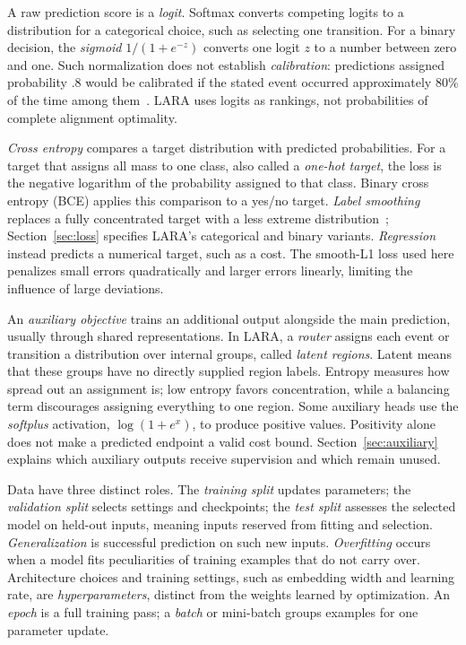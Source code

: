 A raw prediction score is a \emph{logit}. Softmax converts competing logits to a distribution for a categorical choice, such as selecting one transition. For a binary decision, the \emph{sigmoid} $1/(1+e^{-z})$ converts one logit $z$ to a number between zero and one. Such normalization does not establish \emph{calibration}: predictions assigned probability $.8$ would be calibrated if the stated event occurred approximately 80\% of the time among them~\cite{Guo2017}. LARA uses logits as rankings, not probabilities of complete alignment optimality.

\emph{Cross entropy} compares a target distribution with predicted probabilities. For a target that assigns all mass to one class, also called a \emph{one-hot target}, the loss is the negative logarithm of the probability assigned to that class. Binary cross entropy (BCE) applies this comparison to a yes/no target. \emph{Label smoothing} replaces a fully concentrated target with a less extreme distribution~\cite{Szegedy2016}; Section~\ref{sec:loss} specifies LARA's categorical and binary variants. \emph{Regression} instead predicts a numerical target, such as a cost. The smooth-L1 loss used here penalizes small errors quadratically and larger errors linearly, limiting the influence of large deviations.

An \emph{auxiliary objective} trains an additional output alongside the main prediction, usually through shared representations. In LARA, a \emph{router} assigns each event or transition a distribution over internal groups, called \emph{latent regions}. Latent means that these groups have no directly supplied region labels. Entropy measures how spread out an assignment is; low entropy favors concentration, while a balancing term discourages assigning everything to one region. Some auxiliary heads use the \emph{softplus} activation, $\log(1+e^x)$, to produce positive values. Positivity alone does not make a predicted endpoint a valid cost bound. Section~\ref{sec:auxiliary} explains which auxiliary outputs receive supervision and which remain unused.

Data have three distinct roles. The \emph{training split} updates parameters; the \emph{validation split} selects settings and checkpoints; the \emph{test split} assesses the selected model on held-out inputs, meaning inputs reserved from fitting and selection. \emph{Generalization} is successful prediction on such new inputs. \emph{Overfitting} occurs when a model fits peculiarities of training examples that do not carry over. Architecture choices and training settings, such as embedding width and learning rate, are \emph{hyperparameters}, distinct from the weights learned by optimization. An \emph{epoch} is a full training pass; a \emph{batch} or mini-batch groups examples for one parameter update.

